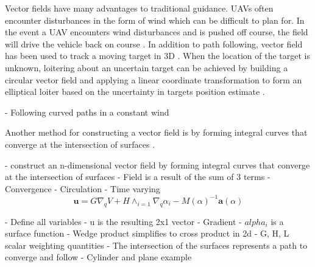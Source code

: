 \documentclass[numbered,pdftex]{ohio-etd}
\begin{document}
Vector fields have many advantages to traditional guidance. UAVs often encounter disturbances in the form of wind which can be difficult to plan for. In the event a UAV encounters wind disturbances and is pushed off course, the field will drive the vehicle back on course \cite{de_marina_guidance_2017}. In addition to path following, vector field has been used to track a moving target in 3D \cite{miao_orthogonal_2016}. When the location of the target is unknown, loitering about an uncertain target can be achieved by building a circular vector field and applying a linear coordinate transformation to form an elliptical loiter based on the uncertainty in targets position estimate \cite{frew_cooperative_2007}. 


%
%
%
%

- Following curved paths in a constant wind \cite{griffiths_vector_2006}


%
%
%

Another method for constructing a vector field is by forming integral curves that converge at the intersection of surfaces \cite{goncalves_artificial_2009}. 

- construct an n-dimensional vector field by forming integral curves that converge at the intersection of surfaces
- Field is a result of the sum of 3 terms
  - Convergence
  - Circulation
  - Time varying\\


\begin{equation}\label{gonFieldeq}
\boldsymbol{u} = G\nabla_qV+H\wedge_{i=1}\nabla_q\alpha_i - M(\alpha)^{-1}\boldsymbol{a}(\alpha)
\end{equation}

- Define all variables
	- u is the resulting 2x1 vector
	- Gradient
	- $alpha_i$ is a surface function
	- Wedge product simplifies to cross product in 2d
	- G, H, L scalar weighting quantities 
	- The intersection of the surfaces represents a path to converge and follow
	- Cylinder and plane example
\end{document}
